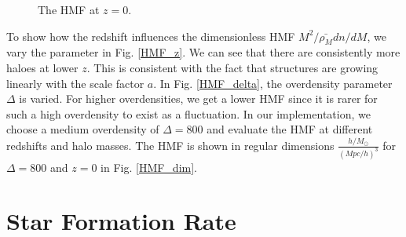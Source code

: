 \begin{figure}
    \centering
    \caption{The HMF at $z=0$.}
\end{figure} 

To show how the redshift influences the dimensionless HMF $M^2/\bar{\rho_M} dn/dM$, we vary the parameter in Fig. \ref{HMF_z}. We can see that there are consistently more haloes at lower $z$. This is consistent with the fact that structures are growing linearly with the scale factor $a$. In Fig. \ref{HMF_delta}, the overdensity parameter $\Delta$ is varied. For higher overdensities, we get a lower HMF since it is rarer for such a high overdensity to exist as a fluctuation. In our implementation, we choose a medium overdensity of $\Delta=800$ and evaluate the HMF at different redshifts and halo masses. The HMF is shown in regular dimensions $\frac{h/M_\odot}{(Mpc/h)^3}$ for $\Delta=800$ and $z=0$ in Fig. \ref{HMF_dim}.


\section{Star Formation Rate}
\label{sfr_section}

